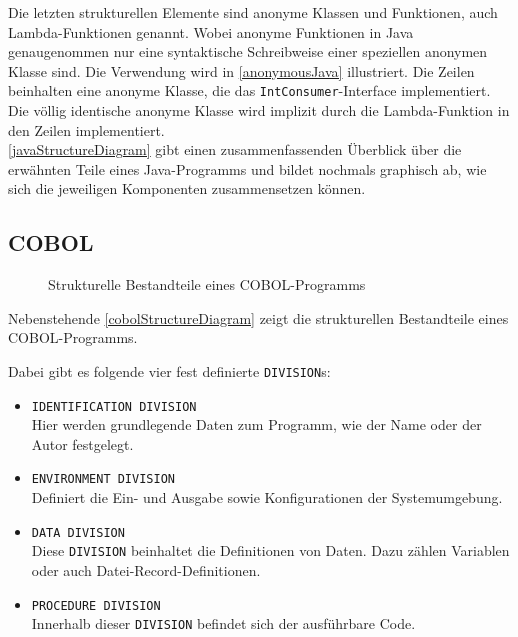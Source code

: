 
Die letzten strukturellen Elemente sind anonyme Klassen und Funktionen, auch Lambda-Funktionen genannt. Wobei anonyme Funktionen in Java genaugenommen nur eine syntaktische Schreibweise einer speziellen anonymen Klasse sind. Die Verwendung wird in \autoref{anonymousJava} illustriert. Die Zeilen  beinhalten eine anonyme Klasse, die das \texttt{IntConsumer}-Interface implementiert. Die völlig identische  anonyme Klasse wird implizit durch die Lambda-Funktion in den Zeilen  implementiert.\\

\autoref{javaStructureDiagram} gibt einen zusammenfassenden Überblick über die erwähnten Teile eines Java-Programms und bildet nochmals graphisch ab, wie sich die jeweiligen Komponenten zusammensetzen können.\\

\subsection*{COBOL}
{

\begin{wrapfigure}{l}{.5\textwidth}
\centering

\caption{Strukturelle Bestandteile eines COBOL-Programms\label{cobolStructureDiagram}}
\end{wrapfigure}
Nebenstehende \autoref{cobolStructureDiagram} zeigt die strukturellen Bestandteile eines COBOL-Programms. 

Dabei gibt es folgende vier fest definierte \texttt{DIVISION}s:
\begin{itemize}
    \item \texttt{IDENTIFICATION DIVISION}\\
    Hier werden grundlegende Daten zum Programm, wie der Name oder der Autor festgelegt.
    \item \texttt{ENVIRONMENT DIVISION}\\
    Definiert die Ein- und Ausgabe sowie Konfigurationen der Systemumgebung.
    \item \texttt{DATA DIVISION}\\
    Diese \texttt{DIVISION} beinhaltet die Definitionen von Daten. Dazu zählen Variablen oder auch Datei-Record-Definitionen.
    \item \texttt{PROCEDURE DIVISION}\\
    Innerhalb dieser \texttt{DIVISION} befindet sich der ausführbare Code.
\end{itemize}


}


